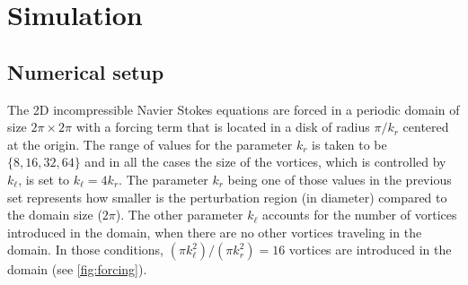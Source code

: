 \documentclass[../main.tex]{subfiles}
\begin{document}
\section{Simulation}
\subsection{Numerical setup}\label{sec:numerical}
The 2D incompressible Navier Stokes equations are forced in a periodic domain of size $2\pi \times 2\pi$ with a forcing term that is located in a disk of radius $\pi/k_r$ centered at the origin. The range of values for the parameter $k_r$ is taken to be $\{8, 16, 32, 64\}$ and in all the cases the size of the vortices, which is controlled by $k_\ell$, is set to $k_\ell = 4 k_r$. The parameter $k_r$ being one of those values in the previous set represents how smaller is the perturbation region (in diameter) compared to the domain size ($2\pi$). The other parameter $k_\ell$ accounts for the number of vortices introduced in the domain, when there are no other vortices traveling in the domain. In those conditions, $(\pi k_\ell^2)/(\pi k_r^2) = 16$ vortices are introduced in the domain (see \cref{fig:forcing}).
\end{document}
